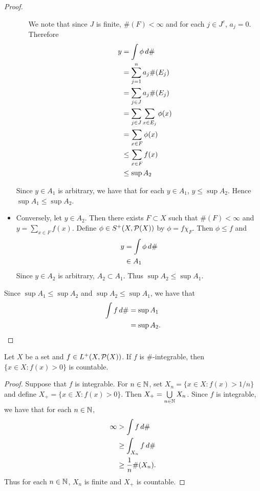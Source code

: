 \documentclass{book}
\begin{document}
\begin{proof}
\begin{itemize}
\begin{itemize}
				We note that since $J$ is finite, $\#(F) < \infty$ and for each $j \in J^c$, $a_j = 0$. Therefore
				\begin{align*}
					y
					& = \int \phi \, d \# \\
					& = \sum_{j =1}^n a_j \#(E_j) \\
					& = \sum_{j \in J} a_j \#(E_j) \\
					& = \sum_{j \in J} \sum_{x \in E_j} \phi(x) \\
					& = \sum_{x \in F} \phi(x) \\
					& \leq \sum_{x \in F} f(x) \\
					& \leq \sup A_2 
				\end{align*}
			\end{itemize}
			Since $y \in A_1$ is arbitrary, we have that for each $y \in A_1$, $y \leq \sup A_2$. Hence $\sup A_1 \leq \sup A_2$. 
			\item Conversely, let $y \in A_2$. Then there exists $F \subset X$ such that $\#(F) < \infty$ and $y = \sum\limits_{x \in F} f(x)$.
			Define $\phi \in S^+(X, \mathcal{P}(X))$ by $\phi = f \chi_F$. Then $\phi \leq f$ and 
			\begin{align*}
				y 
				& = \int \phi \, d \# \\
				& \in A_1
			\end{align*}
			Since $y \in A_2$ is arbitrary, $A_2 \subset A_1$. Thus $\sup A_2 \leq \sup A_1$. 
		\end{itemize}
		Since $\sup A_1 \leq \sup A_2$ and $\sup A_2 \leq \sup A_1$, we have that
		\begin{align*}
			\int f \, d \# 
			& = \sup A_1 \\
			& = \sup A_2.
		\end{align*}
	\end{proof}

	\begin{ex} 
		 	Let $X$ be a set and $f \in L^+(X, \mathcal{P}(X))$. If $f$ is $\#$-integrable, then $\{x \in X: f(x) > 0\}$ is countable.
	\end{ex}

	\begin{proof} 
		Suppose that $f$ is integrable. For $n \in \mathbb{N}$, set $X_n = \{x \in X: f(x) > 1/n\}$ and define $X_+ = \{x \in X: f(x) > 0\}$. Then $X_+ = \bigcup\limits_{n \in \mathbb{N}}X_n$. Since $f$ is integrable, we have that for each $n \in \mathbb{N}$,
		\begin{align*}
			\infty 
			&> \int f \, d \#\\
			&\geq \int_{X_n} f \, d \# \\
			&\geq \frac{1}{n} \#(X_n).
		\end{align*}
		Thus for each $n \in \mathbb{N}$, $X_n$ is finite and $X_+$ is countable.
	\end{proof}
\end{document}
